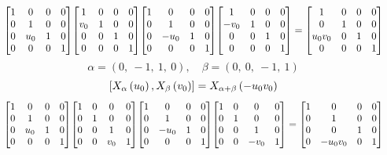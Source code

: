\documentclass[11pt]{article}
\theoremstyle{definition}
\begin{document}
\[
\scaletoalign{\textwidth}{{\left[\begin{matrix}1 & 0 & 0 & 0\\0 & 1 & 0 & 0\\0 & u_{0} & 1 & 0\\0 & 0 & 0 & 1\end{matrix}\right]} {\left[\begin{matrix}1 & 0 & 0 & 0\\v_{0} & 1 & 0 & 0\\0 & 0 & 1 & 0\\0 & 0 & 0 & 1\end{matrix}\right]} {\left[\begin{matrix}1 & 0 & 0 & 0\\0 & 1 & 0 & 0\\0 & - u_{0} & 1 & 0\\0 & 0 & 0 & 1\end{matrix}\right]} {\left[\begin{matrix}1 & 0 & 0 & 0\\- v_{0} & 1 & 0 & 0\\0 & 0 & 1 & 0\\0 & 0 & 0 & 1\end{matrix}\right]} = {\left[\begin{matrix}1 & 0 & 0 & 0\\0 & 1 & 0 & 0\\u_{0} v_{0} & 0 & 1 & 0\\0 & 0 & 0 & 1\end{matrix}\right]}}
\]
\[
\alpha = \left( 0, \  -1, \  1, \  0\right), \quad \beta = \left( 0, \  0, \  -1, \  1\right)
\]
\[
\scaletoalign{\textwidth}{\left[ X_{\alpha}\left(u_{0}\right), X_{\beta}\left(v_{0}\right) \right] = X_{\alpha + \beta}\left(- u_{0} v_{0}\right)}
\]
\[
\scaletoalign{\textwidth}{{\left[\begin{matrix}1 & 0 & 0 & 0\\0 & 1 & 0 & 0\\0 & u_{0} & 1 & 0\\0 & 0 & 0 & 1\end{matrix}\right]} {\left[\begin{matrix}1 & 0 & 0 & 0\\0 & 1 & 0 & 0\\0 & 0 & 1 & 0\\0 & 0 & v_{0} & 1\end{matrix}\right]} {\left[\begin{matrix}1 & 0 & 0 & 0\\0 & 1 & 0 & 0\\0 & - u_{0} & 1 & 0\\0 & 0 & 0 & 1\end{matrix}\right]} {\left[\begin{matrix}1 & 0 & 0 & 0\\0 & 1 & 0 & 0\\0 & 0 & 1 & 0\\0 & 0 & - v_{0} & 1\end{matrix}\right]} = {\left[\begin{matrix}1 & 0 & 0 & 0\\0 & 1 & 0 & 0\\0 & 0 & 1 & 0\\0 & - u_{0} v_{0} & 0 & 1\end{matrix}\right]}}
\]
\end{document}
